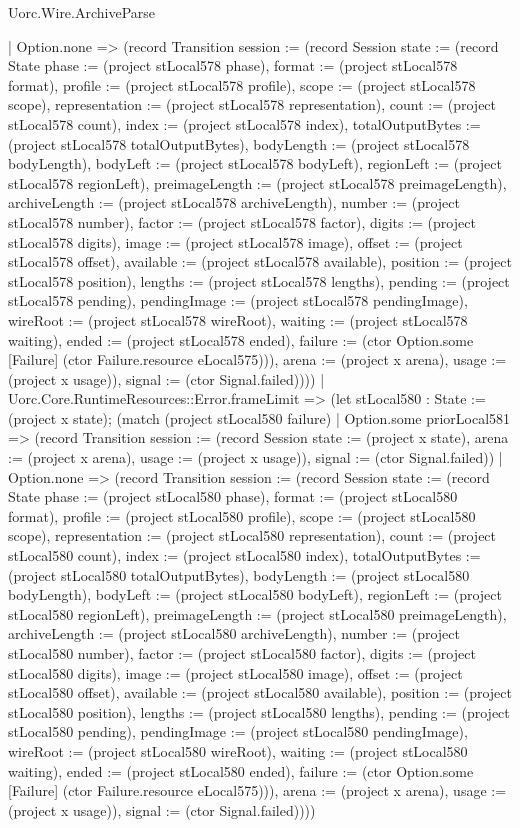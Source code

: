 \begin{lexlean}{Uorc.Wire.ArchiveParse}
\begin{semanticmodule}
{        | Option.none => (record Transition {session := (record Session {state := (record State {phase := (project stLocal578 phase), format := (project stLocal578 format), profile := (project stLocal578 profile), scope := (project stLocal578 scope), representation := (project stLocal578 representation), count := (project stLocal578 count), index := (project stLocal578 index), totalOutputBytes := (project stLocal578 totalOutputBytes), bodyLength := (project stLocal578 bodyLength), bodyLeft := (project stLocal578 bodyLeft), regionLeft := (project stLocal578 regionLeft), preimageLength := (project stLocal578 preimageLength), archiveLength := (project stLocal578 archiveLength), number := (project stLocal578 number), factor := (project stLocal578 factor), digits := (project stLocal578 digits), image := (project stLocal578 image), offset := (project stLocal578 offset), available := (project stLocal578 available), position := (project stLocal578 position), lengths := (project stLocal578 lengths), pending := (project stLocal578 pending), pendingImage := (project stLocal578 pendingImage), wireRoot := (project stLocal578 wireRoot), waiting := (project stLocal578 waiting), ended := (project stLocal578 ended), failure := (ctor Option.some [Failure] (ctor Failure.resource eLocal575))}), arena := (project x arena), usage := (project x usage)}), signal := (ctor Signal.failed)})))
      | Uorc.Core.RuntimeResources::Error.frameLimit => (let stLocal580 : State := (project x state); (match (project stLocal580 failure)
        | Option.some priorLocal581 => (record Transition {session := (record Session {state := (project x state), arena := (project x arena), usage := (project x usage)}), signal := (ctor Signal.failed)})
        | Option.none => (record Transition {session := (record Session {state := (record State {phase := (project stLocal580 phase), format := (project stLocal580 format), profile := (project stLocal580 profile), scope := (project stLocal580 scope), representation := (project stLocal580 representation), count := (project stLocal580 count), index := (project stLocal580 index), totalOutputBytes := (project stLocal580 totalOutputBytes), bodyLength := (project stLocal580 bodyLength), bodyLeft := (project stLocal580 bodyLeft), regionLeft := (project stLocal580 regionLeft), preimageLength := (project stLocal580 preimageLength), archiveLength := (project stLocal580 archiveLength), number := (project stLocal580 number), factor := (project stLocal580 factor), digits := (project stLocal580 digits), image := (project stLocal580 image), offset := (project stLocal580 offset), available := (project stLocal580 available), position := (project stLocal580 position), lengths := (project stLocal580 lengths), pending := (project stLocal580 pending), pendingImage := (project stLocal580 pendingImage), wireRoot := (project stLocal580 wireRoot), waiting := (project stLocal580 waiting), ended := (project stLocal580 ended), failure := (ctor Option.some [Failure] (ctor Failure.resource eLocal575))}), arena := (project x arena), usage := (project x usage)}), signal := (ctor Signal.failed)})))
}
\end{semanticmodule}
\end{lexlean}
